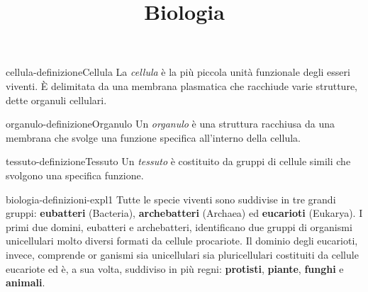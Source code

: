 \documentclass[preview]{standalone}
\begin{document}
\title{Biologia}
\genpage

\begin{snippetdefinition}{cellula-definizione}{Cellula}
    La \textit{cellula} è la più piccola unità funzionale degli esseri
    viventi. È delimitata da una membrana plasmatica
    che racchiude varie strutture, dette organuli cellulari.
\end{snippetdefinition}

\begin{snippetdefinition}{organulo-definizione}{Organulo}
    Un \textit{organulo} è una struttura racchiusa da una membrana che svolge
    una funzione specifica all'interno della cellula.
\end{snippetdefinition}

\begin{snippetdefinition}{tessuto-definizione}{Tessuto}
    Un \textit{tessuto} è costituito da gruppi
    di cellule simili che svolgono
    una specifica funzione.
\end{snippetdefinition}

\begin{snippet}{biologia-definizioni-expl1}
Tutte le specie viventi sono suddivise in tre grandi gruppi:
\textbf{eubatteri} (Bacteria), \textbf{archebatteri} (Archaea)
ed \textbf{eucarioti} (Eukarya).
I primi due domini, eubatteri e archebatteri, identificano due gruppi di organismi
unicellulari molto diversi formati da cellule
procariote.
Il dominio degli eucarioti, invece, comprende or ganismi sia unicellulari
sia pluricellulari costituiti da cellule eucariote ed è,
a sua volta, suddiviso in più regni: \textbf{protisti},
\textbf{piante}, \textbf{funghi} e \textbf{animali}.
\end{snippet}
\end{document}
